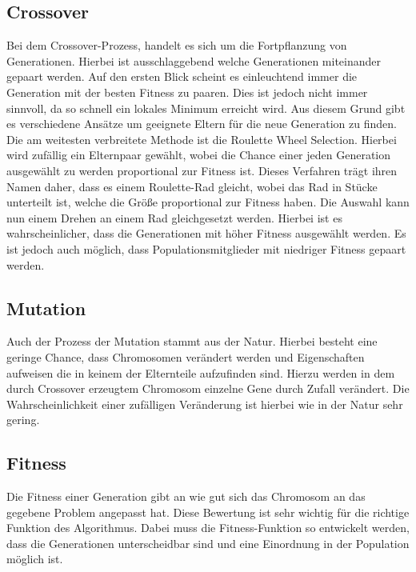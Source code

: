 \subsection{Crossover}
\label{chap:grundlagen_cossover}
Bei dem Crossover-Prozess, handelt es sich um die Fortpflanzung von Generationen. Hierbei ist ausschlaggebend welche Generationen miteinander gepaart werden. Auf den ersten Blick scheint es einleuchtend immer die Generation mit der besten Fitness zu paaren. Dies ist jedoch nicht immer sinnvoll, da so schnell ein lokales Minimum erreicht wird. Aus diesem Grund gibt es verschiedene Ansätze um geeignete Eltern für die neue Generation zu finden.\cite{davis1991handbook} Die am weitesten verbreitete Methode ist die Roulette Wheel Selection. Hierbei wird zufällig ein Elternpaar gewählt, wobei die Chance einer jeden Generation ausgewählt zu werden proportional zur Fitness ist. Dieses Verfahren trägt ihren Namen daher, dass es einem Roulette-Rad gleicht, wobei das Rad in Stücke unterteilt ist, welche die Größe proportional zur Fitness haben. Die Auswahl kann nun einem Drehen an einem Rad gleichgesetzt werden. Hierbei ist es wahrscheinlicher, dass die Generationen mit höher Fitness ausgewählt werden. Es ist jedoch auch möglich, dass Populationsmitglieder mit niedriger Fitness gepaart werden.

\subsection{Mutation}
Auch der Prozess der Mutation stammt aus der Natur. Hierbei besteht eine geringe Chance, dass Chromosomen verändert werden und Eigenschaften aufweisen die in keinem der Elternteile aufzufinden sind. Hierzu werden in dem durch Crossover erzeugtem Chromosom einzelne Gene durch Zufall verändert. Die Wahrscheinlichkeit einer zufälligen Veränderung ist hierbei wie in der Natur sehr gering.\cite{davis1991handbook}
\subsection{Fitness}
Die Fitness einer Generation gibt an wie gut sich das Chromosom an das gegebene Problem angepasst hat. Diese Bewertung ist sehr wichtig für die richtige Funktion des Algorithmus. Dabei muss die Fitness-Funktion so entwickelt werden, dass die Generationen unterscheidbar sind und eine Einordnung in der Population möglich ist. 
